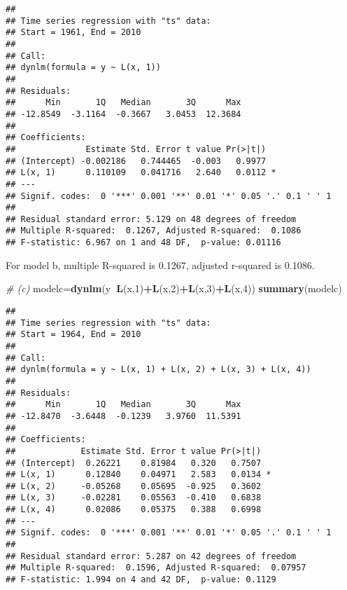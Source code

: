 \documentclass[]{article}
\newenvironment{Shaded}{\begin{snugshade}}{\end{snugshade}}
\newcommand{\KeywordTok}[1]{\textcolor[rgb]{0.13,0.29,0.53}{\textbf{#1}}}
\newcommand{\DecValTok}[1]{\textcolor[rgb]{0.00,0.00,0.81}{#1}}
\newcommand{\CommentTok}[1]{\textcolor[rgb]{0.56,0.35,0.01}{\textit{#1}}}
\newcommand{\OperatorTok}[1]{\textcolor[rgb]{0.81,0.36,0.00}{\textbf{#1}}}
\newcommand{\NormalTok}[1]{#1}
\begin{document}
\begin{verbatim}
## 
## Time series regression with "ts" data:
## Start = 1961, End = 2010
## 
## Call:
## dynlm(formula = y ~ L(x, 1))
## 
## Residuals:
##      Min       1Q   Median       3Q      Max 
## -12.8549  -3.1164  -0.3667   3.0453  12.3684 
## 
## Coefficients:
##              Estimate Std. Error t value Pr(>|t|)  
## (Intercept) -0.002186   0.744465  -0.003   0.9977  
## L(x, 1)      0.110109   0.041716   2.640   0.0112 *
## ---
## Signif. codes:  0 '***' 0.001 '**' 0.01 '*' 0.05 '.' 0.1 ' ' 1
## 
## Residual standard error: 5.129 on 48 degrees of freedom
## Multiple R-squared:  0.1267, Adjusted R-squared:  0.1086 
## F-statistic: 6.967 on 1 and 48 DF,  p-value: 0.01116
\end{verbatim}

\indent For model b, multiple R-squared is 0.1267, adjusted r-squared is
0.1086.

\begin{Shaded}
\begin{Highlighting}[]
\CommentTok{# (c) }
\NormalTok{modelc=}\KeywordTok{dynlm}\NormalTok{(y}\OperatorTok{~}\KeywordTok{L}\NormalTok{(x,}\DecValTok{1}\NormalTok{)}\OperatorTok{+}\KeywordTok{L}\NormalTok{(x,}\DecValTok{2}\NormalTok{)}\OperatorTok{+}\KeywordTok{L}\NormalTok{(x,}\DecValTok{3}\NormalTok{)}\OperatorTok{+}\KeywordTok{L}\NormalTok{(x,}\DecValTok{4}\NormalTok{))}
\KeywordTok{summary}\NormalTok{(modelc)}
\end{Highlighting}
\end{Shaded}

\begin{verbatim}
## 
## Time series regression with "ts" data:
## Start = 1964, End = 2010
## 
## Call:
## dynlm(formula = y ~ L(x, 1) + L(x, 2) + L(x, 3) + L(x, 4))
## 
## Residuals:
##      Min       1Q   Median       3Q      Max 
## -12.8470  -3.6448  -0.1239   3.9760  11.5391 
## 
## Coefficients:
##             Estimate Std. Error t value Pr(>|t|)  
## (Intercept)  0.26221    0.81984   0.320   0.7507  
## L(x, 1)      0.12840    0.04971   2.583   0.0134 *
## L(x, 2)     -0.05268    0.05695  -0.925   0.3602  
## L(x, 3)     -0.02281    0.05563  -0.410   0.6838  
## L(x, 4)      0.02086    0.05375   0.388   0.6998  
## ---
## Signif. codes:  0 '***' 0.001 '**' 0.01 '*' 0.05 '.' 0.1 ' ' 1
## 
## Residual standard error: 5.287 on 42 degrees of freedom
## Multiple R-squared:  0.1596, Adjusted R-squared:  0.07957 
## F-statistic: 1.994 on 4 and 42 DF,  p-value: 0.1129
\end{verbatim}
\end{document}
